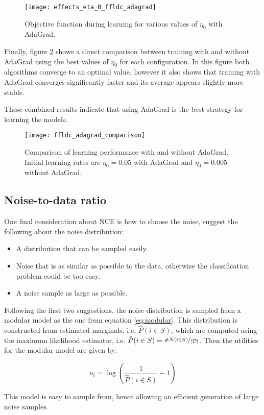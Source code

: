 \begin{figure}
  \centering
  \texttt{[image: effects\_eta\_0\_ffldc\_adagrad]}
  \caption{Objective function during learning for various values of $\eta_0$ with AdaGrad.}
  \label{fig:effects_adagrad}
\end{figure}

Finally, figure \ref{fig:comparison_adagrad_ffldc_toy} shows a direct comparison between training with and without AdaGrad using the best values of $\eta_0$ for each configuration. In this figure both algorithms converge to an optimal value, however it also shows that training with AdaGrad converges significantly faster and its average appears slightly more stable.

These combined results indicate that using AdaGrad is the best strategy for learning the models.

\begin{figure}
  \centering
  \texttt{[image: ffldc\_adagrad\_comparison]}
  \caption{Comparison of learning performance with and without AdaGrad. Initial learning rates are $\eta_0 = 0.05$ with AdaGrad and $\eta_0 = 0.005$ without AdaGrad.}
  \label{fig:comparison_adagrad_ffldc_toy}
\end{figure}

\subsection{Noise-to-data ratio}

One final consideration about NCE is how to choose the noise, \citet{Gutmann12NCE} suggest the following about the noise distribution:

\begin{itemize}
  \item A distribution that can be sampled easily.
  \item Noise that is as similar as possible to the data, otherwise the classification problem could be too easy.
  \item A noise sample as large as possible.
\end{itemize}

Following the first two suggestions, the noise distribution is sampled from a modular model as the one from equation \ref{eq:modular}. This distribution is constructed from estimated marginals, i.e. $\hat{P}(i \in S)$, which are computed using the maximum likelihood estimator, i.e. $\hat{P}(i \in S) = \nicefrac{\#N(i \in S)}{|\mathcal{D}|}$. Then the utilities for the modular model are given by:

\begin{equation}
  u_{i} = \log{\left(\frac{1}{\hat{P}(i \in S)} - 1\right)}
\end{equation}

This model is easy to sample from, hence allowing an efficient generation of large noise samples.